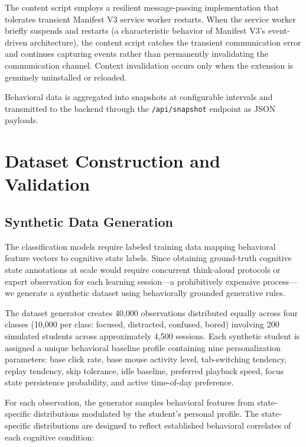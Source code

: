 \documentclass[conference]{IEEEtran}
\begin{document}
The content script employs a resilient message-passing implementation that tolerates transient Manifest V3 service worker restarts. When the service worker briefly suspends and restarts (a characteristic behavior of Manifest V3's event-driven architecture), the content script catches the transient communication error and continues capturing events rather than permanently invalidating the communication channel. Context invalidation occurs only when the extension is genuinely uninstalled or reloaded.

Behavioral data is aggregated into snapshots at configurable intervals and transmitted to the backend through the \texttt{/api/snapshot} endpoint as JSON payloads.

\section{Dataset Construction and Validation}

\subsection{Synthetic Data Generation}

The classification models require labeled training data mapping behavioral feature vectors to cognitive state labels. Since obtaining ground-truth cognitive state annotations at scale would require concurrent think-aloud protocols or expert observation for each learning session---a prohibitively expensive process---we generate a synthetic dataset using behaviorally grounded generative rules.

The dataset generator creates 40,000 observations distributed equally across four classes (10,000 per class: focused, distracted, confused, bored) involving 200 simulated students across approximately 4,500 sessions. Each synthetic student is assigned a unique behavioral baseline profile containing nine personalization parameters: base click rate, base mouse activity level, tab-switching tendency, replay tendency, skip tolerance, idle baseline, preferred playback speed, focus state persistence probability, and active time-of-day preference.

For each observation, the generator samples behavioral features from state-specific distributions modulated by the student's personal profile. The state-specific distributions are designed to reflect established behavioral correlates of each cognitive condition:
\end{document}

